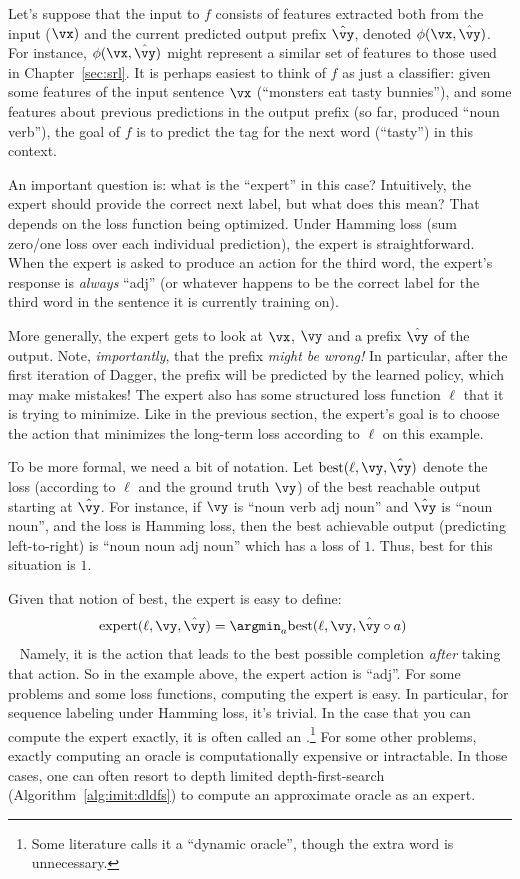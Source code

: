 Let's suppose that the input to $f$ consists of features extracted both from the input ($\vx)$ and the current predicted output prefix $\hat\vy$, denoted $\phi(\vx, \hat\vy)$.
For instance, $\phi(\vx,\hat\vy)$ might represent a similar set of features to those used in Chapter~\ref{sec:srl}.
It is perhaps easiest to think of $f$ as just a classifier:
given some features of the input sentence $\vx$ (``monsters eat tasty bunnies''),
and some features about previous predictions in the output prefix (so far, produced ``noun verb''),
the goal of $f$ is to predict the tag for the next word (``tasty'') in this context.

An important question is: what is the ``expert'' in this case?
Intuitively, the expert should provide the correct next label, but what does this mean?
That depends on the loss function being optimized.
Under Hamming loss (sum zero/one loss over each individual prediction), the expert is straightforward.
When the expert is asked to produce an action for the third word, the expert's response is \emph{always} ``adj'' (or whatever happens to be the correct label for the third word in the sentence it is currently training on).

More generally, the expert gets to look at $\vx$, $\vy$ and a prefix $\hat\vy$ of the output.
Note, \emph{importantly}, that the prefix \emph{might be wrong!}
In particular, after the first iteration of Dagger, the prefix will be predicted by the learned policy, which may make mistakes!
The expert also has some structured loss function $\ell$ that it is trying to minimize.
Like in the previous section, the expert's goal is to choose the action that minimizes the long-term loss according to $\ell$ on this example.

To be more formal, we need a bit of notation.
Let $\text{best}(\ell, \vy, \hat\vy)$ denote the loss (according to $\ell$ and the ground truth $\vy$) of the best reachable output starting at $\hat\vy$.
For instance, if $\vy$ is ``noun verb adj noun'' and $\hat\vy$ is ``noun noun'', and the loss is Hamming loss, then the best achievable output (predicting left-to-right) is ``noun noun adj noun'' which has a loss of $1$.
Thus, $\text{best}$ for this situation is $1$.

Given that notion of best, the expert is easy to define:
~
\begin{align}
  \text{expert}(\ell, \vy, \hat\vy)
  &= \argmin_a \text{best}(\ell, \vy, \hat\vy \circ a)
\end{align}
~
Namely, it is the action that leads to the best possible completion \emph{after} taking that action.
So in the example above, the expert action is ``adj''.
For some problems and some loss functions, computing the expert is easy.
In particular, for sequence labeling under Hamming loss, it's trivial.
In the case that you can compute the expert exactly, it is often called an .\footnote{Some literature calls it a ``dynamic oracle'', though the extra word is unnecessary.}
For some other problems, exactly computing an oracle is computationally expensive or intractable.
In those cases, one can often resort to depth limited depth-first-search (Algorithm~\ref{alg:imit:dldfs}) to compute an approximate oracle as an expert.

